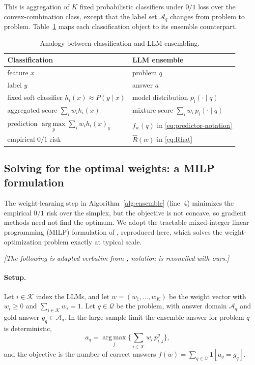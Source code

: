 \documentclass{article} %
\providecommand{\argmax}{\mathop{\mathrm{arg\,max}}\limits}
\providecommand{\Aq}{\mathcal{A}_q}
\providecommand{\eRisk}{\widehat{R}}
\begin{document}
This is aggregation of $K$ fixed probabilistic classifiers under $0/1$ loss over
the convex-combination class, except that the label set $\Aq$ changes from
problem to problem. Table~\ref{tab:dictionary} maps each classification object to
its ensemble counterpart.

\begin{table}[t]
\centering
\caption{Analogy between classification and LLM ensembling.}
\label{tab:dictionary}
\begin{tabular}{ll}
\toprule
Classification & LLM ensemble \\
\midrule
feature $x$ & problem $q$ \\
label $y$ & answer $a$ \\
fixed soft classifier $h_i(x)\approx P(y\mid x)$ & model distribution $p_i(\cdot\mid q)$ \\
aggregated score $\sum_i w_i h_i(x)$ & mixture score $\sum_i w_i\,p_i(\cdot\mid q)$ \\
prediction $\argmax_y \sum_i w_i h_i(x)_y$ & $f_w(q)$ in \eqref{eq:predictor-notation} \\
empirical $0/1$ risk & $\eRisk(w)$ in \eqref{eq:Rhat} \\
\bottomrule
\end{tabular}
\end{table}

\subsection{Solving for the optimal weights: a MILP formulation}
\label{sec:method-milp}

The weight-learning step in Algorithm~\ref{alg:ensemble} (line~4) minimizes the
empirical $0/1$ risk over the simplex, but the objective is not concave, so
gradient methods need not find the optimum. We adopt the tractable
mixed-integer linear programming (MILP) formulation of \citet{komiyama2026best},
reproduced here, which solves the weight-optimization problem exactly at typical
scale.

\medskip
\noindent\emph{[The following is adapted verbatim from
\citet{komiyama2026best}; notation is reconciled with ours.]}

\paragraph{Setup.} Let $i \in \mathcal{K}$ index the LLMs, and let
$w = (w_1,\dots,w_K)$ be the weight vector with $w_i \ge 0$ and
$\sum_{i \in \mathcal{K}} w_i = 1$. Let $q \in \mathcal{Q}$ be the problem, with
answer domain $\mathcal{A}_q$ and gold answer $g_q \in \mathcal{A}_q$. In the
large-sample limit the ensemble answer for problem $q$ is deterministic,
\[
a_q = \argmax_j \Big\{ \sum_{i \in \mathcal{K}} w_i\, p_{i,j}^q \Big\},
\]
and the objective is the number of correct answers
$f(w) = \sum_{q \in \mathcal{Q}} \mathbf{1}[a_q = g_q]$.
\end{document}
